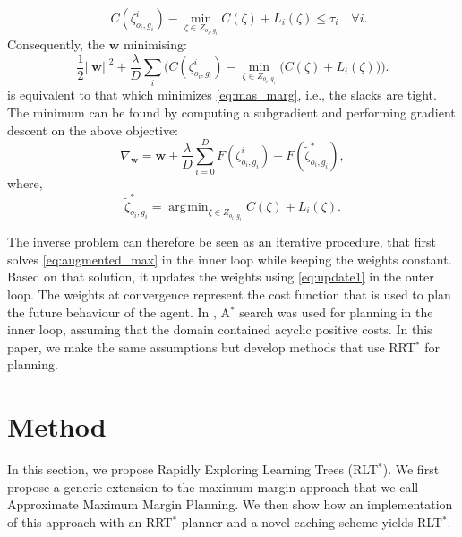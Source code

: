 \documentclass{article}  %
\DeclareMathOperator*{\argmin}{\arg\!\min}
\begin{document}
\begin{equation}
	 \quad C(\zeta^i_{o_i,g_i}) - \min_{\zeta \in Z_{o_i,g_i}} C(\zeta) + L_i(\zeta)  \leq \tau_i  \quad \forall i.
\end{equation}
Consequently, the $\mathbf{w}$ minimising:
\begin{equation}
	\frac{1}{2}||\mathbf{w}||^2 + \frac{\lambda}{D} \sum_i \big( C(\zeta^i_{o_i,g_i}) - \min_{\zeta \in Z_{o_i,g_i}}\big(C(\zeta) + L_i(\zeta)\big) \big) \big. \label{eq:unconstrained}
\end{equation}
is equivalent to that which minimizes \eqref{eq:mas_marg}, i.e., the slacks are tight.
The minimum can be found by computing a subgradient and performing gradient descent on the above objective:
\begin{equation}
	\nabla_{\mathbf{w}} =\mathbf{w} +  \frac{\lambda}{D} \sum_{i=0}^D F(\zeta^i_{o_i,g_i}) - F(\tilde{\zeta}^*_{o_i,g_i}), \label{eq:update1}
\end{equation}
where,
\begin{equation}
	\tilde{\zeta}^*_{o_i,g_i} = \argmin_{\zeta \in Z_{o_i,g_i}} C(\zeta) + L_i(\zeta). \label{eq:augmented_max}
\end{equation}

The inverse problem can therefore be seen as an iterative procedure, that first solves \eqref{eq:augmented_max} in the inner loop while keeping the weights constant. Based on that solution, it updates the weights using \eqref{eq:update1} in the outer loop. The weights at convergence represent the cost function that is used to plan the future behaviour of the agent. In \cite{ratliff2006maximum}, A$^*$ search was used for planning in the inner loop, assuming that the domain contained acyclic positive costs. In this paper, we make the same assumptions but develop methods that use RRT$^*$ for planning.

\section{Method}
	In this section, we propose Rapidly Exploring Learning Trees (RLT$^*$).  We first propose a generic extension to the maximum margin approach that we call Approximate Maximum Margin Planning.  We then show how an implementation of this approach with an RRT$^*$ planner and a novel caching scheme yields RLT$^*$.
\end{document}
